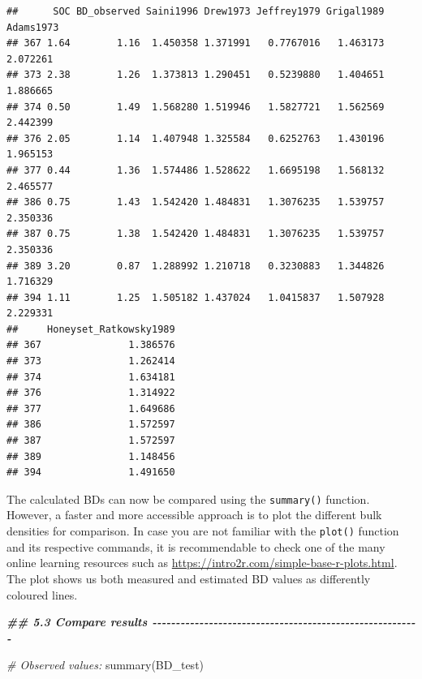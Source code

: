 \documentclass[
  10pt,
  b5paper,
  oneside]{book}
\newenvironment{Shaded}{\begin{snugshade}}{\end{snugshade}}
\newcommand{\CommentTok}[1]{\textcolor[rgb]{0.56,0.35,0.01}{\textit{#1}}}
\newcommand{\DocumentationTok}[1]{\textcolor[rgb]{0.56,0.35,0.01}{\textbf{\textit{#1}}}}
\newcommand{\FunctionTok}[1]{\textcolor[rgb]{0.00,0.00,0.00}{#1}}
\newcommand{\NormalTok}[1]{#1}
\begin{document}
\begin{verbatim}
##      SOC BD_observed Saini1996 Drew1973 Jeffrey1979 Grigal1989 Adams1973
## 367 1.64        1.16  1.450358 1.371991   0.7767016   1.463173  2.072261
## 373 2.38        1.26  1.373813 1.290451   0.5239880   1.404651  1.886665
## 374 0.50        1.49  1.568280 1.519946   1.5827721   1.562569  2.442399
## 376 2.05        1.14  1.407948 1.325584   0.6252763   1.430196  1.965153
## 377 0.44        1.36  1.574486 1.528622   1.6695198   1.568132  2.465577
## 386 0.75        1.43  1.542420 1.484831   1.3076235   1.539757  2.350336
## 387 0.75        1.38  1.542420 1.484831   1.3076235   1.539757  2.350336
## 389 3.20        0.87  1.288992 1.210718   0.3230883   1.344826  1.716329
## 394 1.11        1.25  1.505182 1.437024   1.0415837   1.507928  2.229331
##     Honeyset_Ratkowsky1989
## 367               1.386576
## 373               1.262414
## 374               1.634181
## 376               1.314922
## 377               1.649686
## 386               1.572597
## 387               1.572597
## 389               1.148456
## 394               1.491650
\end{verbatim}

The calculated BDs can now be compared using the \texttt{summary()} function. However, a faster and more accessible approach is to plot the different bulk densities for comparison. In case you are not familiar with the \texttt{plot()} function and its respective commands, it is recommendable to check one of the many online learning resources such as \url{https://intro2r.com/simple-base-r-plots.html}. The plot shows us both measured and estimated BD values as differently coloured lines.

\begin{Shaded}
\begin{Highlighting}[]
\DocumentationTok{\#\# 5.3 Compare results {-}{-}{-}{-}{-}{-}{-}{-}{-}{-}{-}{-}{-}{-}{-}{-}{-}{-}{-}{-}{-}{-}{-}{-}{-}{-}{-}{-}{-}{-}{-}{-}{-}{-}{-}{-}{-}{-}{-}{-}{-}{-}{-}{-}{-}{-}{-}{-}{-}{-}{-}{-}{-}{-}{-}{-}{-}}

\CommentTok{\# Observed values:}
\FunctionTok{summary}\NormalTok{(BD\_test)}
\end{Highlighting}
\end{Shaded}
\end{document}
